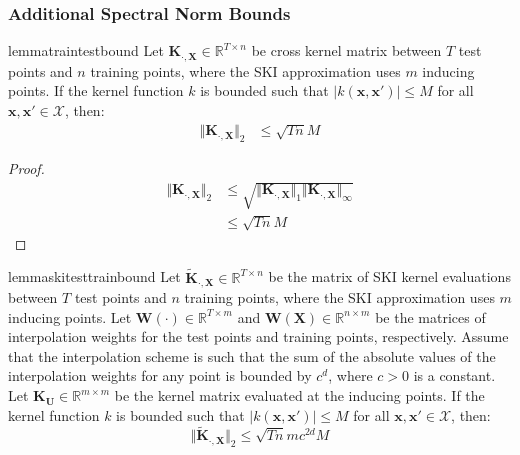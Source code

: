 \subsubsection{Additional Spectral Norm Bounds}
\begin{restatable}{lemma}{traintestbound}\label{lemma:test-train-bound}
    Let $\textbf{K}_{\cdot,\textbf{X}} \in \mathbb{R}^{T \times n}$ be cross kernel matrix between $T$ test points and $n$ training points, where the SKI approximation uses $m$ inducing points. If the kernel function $k$ is bounded such that $|k(\textbf{x}, \textbf{x}')| \leq M$ for all $\textbf{x}, \textbf{x}'\in \mathcal{X}$, then:
    \begin{align*}
        \Vert \textbf{K}_{\cdot,\textbf{X}}\Vert_2&\leq \sqrt{Tn}M
    \end{align*}
\end{restatable}
\begin{proof}
\begin{align*}
    \Vert \textbf{K}_{\cdot,\textbf{X}}\Vert_2&\leq \sqrt{\Vert \textbf{K}_{\cdot,\textbf{X}}\Vert_1\Vert \textbf{K}_{\cdot,\textbf{X}}\Vert_\infty}\\
    &\leq \sqrt{Tn}M
\end{align*}
\end{proof}
\begin{restatable}{lemma}{skitesttrainbound}\label{lemma:ski-test-train-bound}
    Let $\tilde{\textbf{K}}_{\cdot,\textbf{X}} \in \mathbb{R}^{T \times n}$ be the matrix of SKI kernel evaluations between $T$ test points and $n$ training points, where the SKI approximation uses $m$ inducing points. Let $\textbf{W}(\cdot) \in \mathbb{R}^{T \times m}$ and $\textbf{W}(\textbf{X}) \in \mathbb{R}^{n \times m}$ be the matrices of interpolation weights for the test points and training points, respectively. Assume that the interpolation scheme is such that the sum of the absolute values of the interpolation weights for any point is bounded by $c^d$, where $c>0$ is a constant. Let $\textbf{K}_{\textbf{U}} \in \mathbb{R}^{m \times m}$ be the kernel matrix evaluated at the inducing points. If the kernel function $k$ is bounded such that $|k(\textbf{x}, \textbf{x}')| \leq M$ for all $\textbf{x}, \textbf{x}'\in \mathcal{X}$, then:
    $$
    \Vert \tilde{\textbf{K}}_{\cdot,\textbf{X}}\Vert_2 \leq \sqrt{Tn} m c^{2d} M
    $$
\end{restatable}

